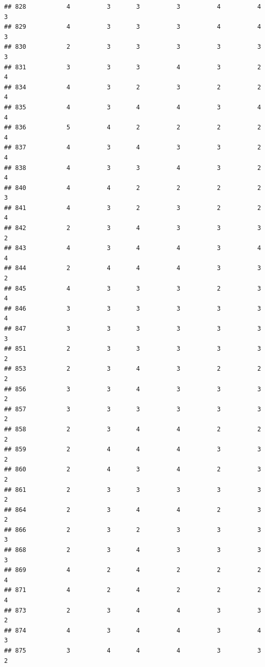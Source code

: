 \documentclass[
]{article}
\begin{document}
\begin{verbatim}
## 828           4          3       3          3          4          4        3
## 829           4          3       3          3          4          4        3
## 830           2          3       3          3          3          3        3
## 831           3          3       3          4          3          2        4
## 834           4          3       2          3          2          2        4
## 835           4          3       4          4          3          4        4
## 836           5          4       2          2          2          2        4
## 837           4          3       4          3          3          2        4
## 838           4          3       3          4          3          2        4
## 840           4          4       2          2          2          2        3
## 841           4          3       2          3          2          2        4
## 842           2          3       4          3          3          3        2
## 843           4          3       4          4          3          4        4
## 844           2          4       4          4          3          3        2
## 845           4          3       3          3          2          3        4
## 846           3          3       3          3          3          3        4
## 847           3          3       3          3          3          3        3
## 851           2          3       3          3          3          3        2
## 853           2          3       4          3          2          2        2
## 856           3          3       4          3          3          3        2
## 857           3          3       3          3          3          3        2
## 858           2          3       4          4          2          2        2
## 859           2          4       4          4          3          3        2
## 860           2          4       3          4          2          3        2
## 861           2          3       3          3          3          3        2
## 864           2          3       4          4          2          3        2
## 866           2          3       2          3          3          3        3
## 868           2          3       4          3          3          3        3
## 869           4          2       4          2          2          2        4
## 871           4          2       4          2          2          2        4
## 873           2          3       4          4          3          3        2
## 874           4          3       4          4          3          4        3
## 875           3          4       4          4          3          3        2

\end{verbatim}
\end{document}
